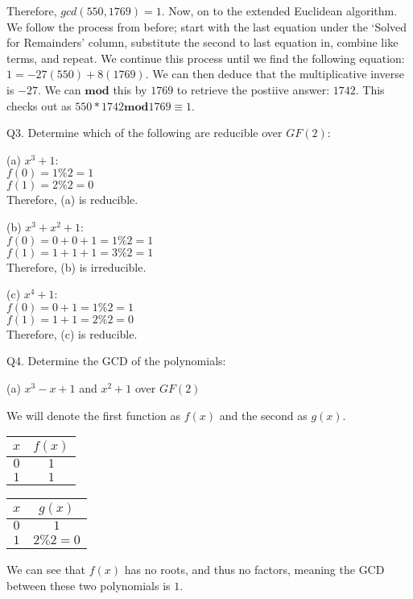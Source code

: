 \documentclass[11pt]{article}
\newcommand{\gap}{\vspace{3mm}}
\newcommand{\bigGap}{\vspace{10mm}}
\begin{document}
\gap{}

Therefore, $gcd(550, 1769)=1$. Now, on to the extended Euclidean algorithm. We follow the process from before; start with the last equation under the `Solved for Remainders' column, substitute the second to last equation in, combine like terms, and repeat. We continue this process until we find the following equation: $1=-27(550)+8(1769)$. We can then deduce that the multiplicative inverse is $-27$. We can $\mathbf{mod}$ this by $1769$ to retrieve the postiive answer: $1742$. This checks out as $550 * 1742\mathbf{mod} 1769\equiv 1$.

\bigGap{}

Q3. Determine which of the following are reducible over $GF(2)$:\\

\gap{}

(a) $x^3 + 1$:\\
$f(0)=1\%2=1$\\
$f(1)=2\%2=0$\\

Therefore, (a) is reducible.

\gap{}

(b) $x^3+x^2+1$:\\

$f(0)=0+0+1=1\%2=1$\\
$f(1)=1+1+1=3\%2=1$\\

Therefore, (b) is irreducible.

\gap{}

(c) $x^4+1$:\\

$f(0)=0+1=1\%2=1$\\
$f(1)=1+1=2\%2=0$\\

Therefore, (c) is reducible.

\bigGap{}

Q4. Determine the GCD of the polynomials:\\

\gap{}

(a) $x^3-x+1$ and $x^2+1$ over $GF(2)$

\gap{}

We will denote the first function as $f(x)$ and the second as $g(x)$.
\begin{center}
\begin{tabular}{ |c|c| }
\hline
$x$ & $f(x)$\\
\hline
$0$ & $1$\\
$1$ & $1$\\
\hline
\end{tabular}
\begin{tabular}{ |c|c| }
\hline
$x$ & $g(x)$\\
\hline
$0$ & $1$\\
$1$ & $2\%2=0$\\
\hline
\end{tabular}
\end{center}
We can see that $f(x)$ has no roots, and thus no factors, meaning the GCD between these two polynomials is $1$.
\end{document}
